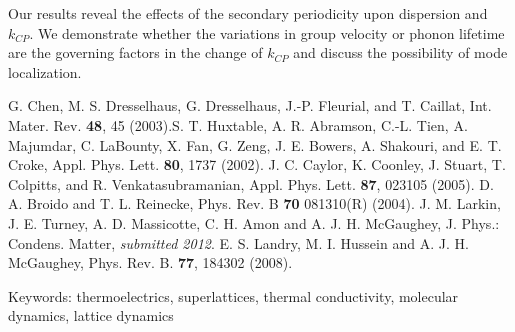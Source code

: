 \documentclass[12pt,twoside]{article}
\begin{document}
\begin{spacing}{1.25}

Our results reveal the effects of the secondary periodicity upon dispersion and $k_{CP}$. We demonstrate whether the variations in group velocity or phonon lifetime are the governing factors in the change of $k_{CP}$ and discuss the possibility of mode localization.\newline
\end{spacing}

\begin{spacing}{1}
\footnotesize
\noindent
[1] G. Chen, M. S. Dresselhaus, G. Dresselhaus, J.-P. Fleurial, and T. Caillat, Int. Mater. Rev. \textbf{48}, 45 (2003).\newline
[2] S. T. Huxtable, A. R. Abramson, C.-L. Tien, A. Majumdar, C. LaBounty, X. Fan, G. Zeng, J. E. Bowers, A. Shakouri, and E. T. Croke, Appl. Phys. Lett. \textbf{80}, 1737 (2002). \newline
[3] J. C. Caylor, K. Coonley, J. Stuart, T. Colpitts, and R. Venkatasubramanian, Appl. Phys. Lett. \textbf{87}, 023105 (2005). \newline
[4] D. A. Broido and T. L. Reinecke, Phys. Rev. B \textbf{70} 081310(R) (2004). \newline
[5]  J. M. Larkin, J. E. Turney, A. D. Massicotte, C. H. Amon and A. J. H. McGaughey, J. Phys.: Condens. Matter, \textit{submitted 2012}. \newline
[6] E. S. Landry, M. I. Hussein and A. J. H. McGaughey, Phys. Rev. B. \textbf{77}, 184302 (2008). \newline

\noindent Keywords: thermoelectrics, superlattices, thermal conductivity, molecular dynamics, lattice dynamics
\end{spacing}
\end{document}
